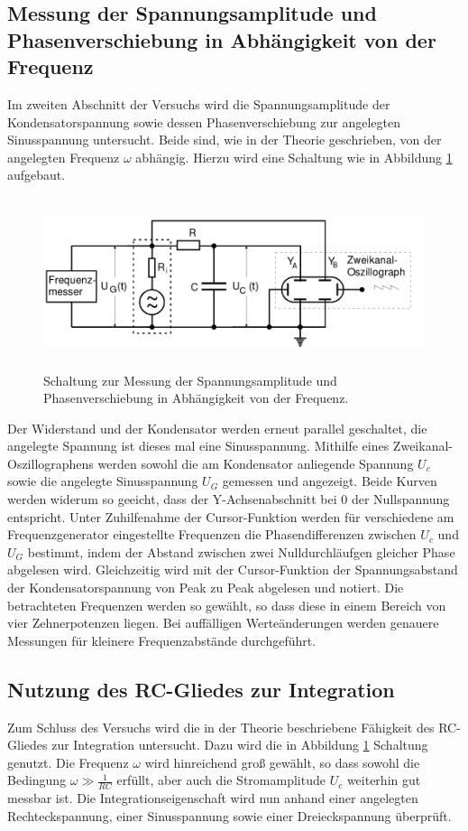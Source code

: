 \subsection{Messung der Spannungsamplitude und Phasenverschiebung in Abhängigkeit von der Frequenz}
Im zweiten Abschnitt der Versuchs wird die Spannungsamplitude der Kondensatorspannung sowie dessen Phasenverschiebung zur angelegten Sinusspannung untersucht.
Beide sind, wie in der Theorie geschrieben, von der angelegten Frequenz $\omega$ abhängig.
Hierzu wird eine Schaltung wie in Abbildung \ref{fig:aufbau_b} aufgebaut.
\begin{figure}[H]
  \centering
  \includegraphics[height=5cm]{aufbau_b.png}
  \caption{Schaltung zur Messung der Spannungsamplitude und Phasenverschiebung in Abhängigkeit von der Frequenz. \cite{sample}}
  \label{fig:aufbau_b}
\end{figure}
Der Widerstand und der Kondensator werden erneut parallel geschaltet, die angelegte Spannung ist dieses mal eine Sinusspannung.
Mithilfe eines Zweikanal-Oszillographens werden sowohl die am Kondensator anliegende Spannung $U_c$ sowie die angelegte Sinusspannung $U_G$ gemessen und angezeigt.
Beide Kurven werden widerum so geeicht, dass der Y-Achsenabschnitt bei 0 der Nullspannung entspricht.
Unter Zuhilfenahme der Cursor-Funktion werden für verschiedene am Frequenzgenerator eingestellte Frequenzen die Phasendifferenzen zwischen $U_c$ und $U_G$ bestimmt, indem der Abstand zwischen zwei Nulldurchläufgen gleicher Phase abgelesen wird.
Gleichzeitig wird mit der Cursor-Funktion der Spannungsabstand der Kondensatorspannung von Peak zu Peak abgelesen und notiert.
Die betrachteten Frequenzen werden so gewählt, so dass diese in einem Bereich von vier Zehnerpotenzen liegen.
Bei auffälligen Werteänderungen werden genauere Messungen für kleinere Frequenzabstände durchgeführt.
\subsection{Nutzung des RC-Gliedes zur Integration}
Zum Schluss des Versuchs wird die in der Theorie beschriebene Fähigkeit des RC-Gliedes zur Integration untersucht.
Dazu wird die in Abbildung \ref{fig:aufbau_b} Schaltung genutzt.
Die Frequenz $\omega$ wird hinreichend groß gewählt, so dass sowohl die Bedingung $ \omega \gg \frac{1}{RC}$ erfüllt, aber auch die Stromamplitude $U_c$ weiterhin gut messbar ist.
Die Integrationseigenschaft wird nun anhand einer angelegten Rechteckspannung, einer Sinusspannung sowie einer Dreieckspannung überprüft.
